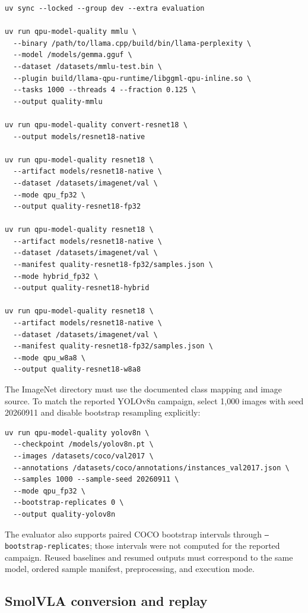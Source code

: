 \documentclass[sigplan,screen,review]{acmart}
\begin{document}
{\footnotesize
\begin{verbatim}
uv sync --locked --group dev --extra evaluation

uv run qpu-model-quality mmlu \
  --binary /path/to/llama.cpp/build/bin/llama-perplexity \
  --model /models/gemma.gguf \
  --dataset /datasets/mmlu-test.bin \
  --plugin build/llama-qpu-runtime/libggml-qpu-inline.so \
  --tasks 1000 --threads 4 --fraction 0.125 \
  --output quality-mmlu

uv run qpu-model-quality convert-resnet18 \
  --output models/resnet18-native

uv run qpu-model-quality resnet18 \
  --artifact models/resnet18-native \
  --dataset /datasets/imagenet/val \
  --mode qpu_fp32 \
  --output quality-resnet18-fp32

uv run qpu-model-quality resnet18 \
  --artifact models/resnet18-native \
  --dataset /datasets/imagenet/val \
  --manifest quality-resnet18-fp32/samples.json \
  --mode hybrid_fp32 \
  --output quality-resnet18-hybrid

uv run qpu-model-quality resnet18 \
  --artifact models/resnet18-native \
  --dataset /datasets/imagenet/val \
  --manifest quality-resnet18-fp32/samples.json \
  --mode qpu_w8a8 \
  --output quality-resnet18-w8a8
\end{verbatim}
}

The ImageNet directory must use the documented class mapping and image source. To match the reported YOLOv8n campaign, select 1,000 images with seed 20260911 and disable bootstrap resampling explicitly:

{\footnotesize
\begin{verbatim}
uv run qpu-model-quality yolov8n \
  --checkpoint /models/yolov8n.pt \
  --images /datasets/coco/val2017 \
  --annotations /datasets/coco/annotations/instances_val2017.json \
  --samples 1000 --sample-seed 20260911 \
  --mode qpu_fp32 \
  --bootstrap-replicates 0 \
  --output quality-yolov8n
\end{verbatim}
}

The evaluator also supports paired COCO bootstrap intervals through \texttt{--bootstrap-replicates}; those intervals were not computed for the reported campaign. Reused baselines and resumed outputs must correspond to the same model, ordered sample manifest, preprocessing, and execution mode.

\subsection{SmolVLA conversion and replay}
\end{document}

